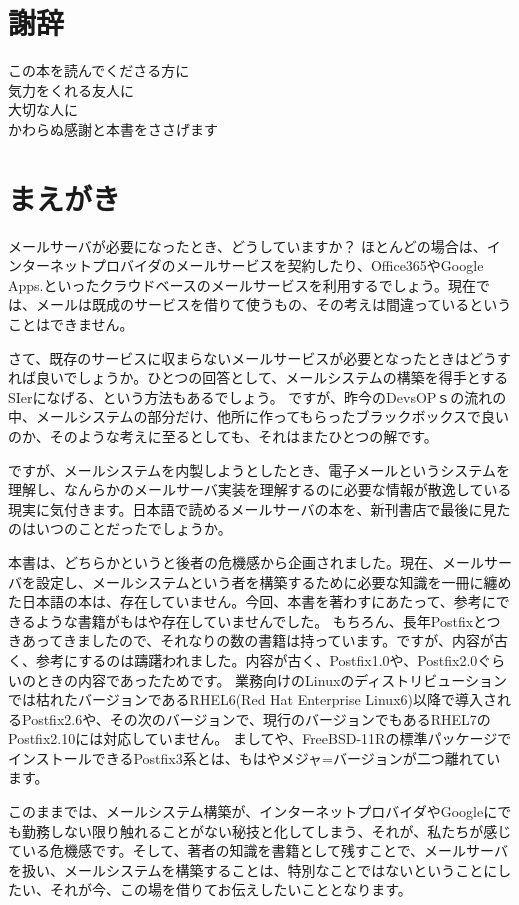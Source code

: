 \section*{謝辞}
\begin{center}
この本を読んでくださる方に \\
気力をくれる友人に \\
大切な人に \\
かわらぬ感謝と本書をささげます
\end{center}

\section*{まえがき}
メールサーバが必要になったとき、どうしていますか？
ほとんどの場合は、インターネットプロバイダのメールサービスを契約したり、Office365やGoogle Apps.といったクラウドベースのメールサービスを利用するでしょう。現在では、メールは既成のサービスを借りて使うもの、その考えは間違っているということはできません。

さて、既存のサービスに収まらないメールサービスが必要となったときはどうすれば良いでしょうか。ひとつの回答として、メールシステムの構築を得手とするSIerになげる、という方法もあるでしょう。
ですが、昨今のDevsOPｓの流れの中、メールシステムの部分だけ、他所に作ってもらったブラックボックスで良いのか、そのような考えに至るとしても、それはまたひとつの解です。

ですが、メールシステムを内製しようとしたとき、電子メールというシステムを理解し、なんらかのメールサーバ実装を理解するのに必要な情報が散逸している現実に気付きます。日本語で読めるメールサーバの本を、新刊書店で最後に見たのはいつのことだったでしょうか。

本書は、どちらかというと後者の危機感から企画されました。現在、メールサーバを設定し、メールシステムという者を構築するために必要な知識を一冊に纏めた日本語の本は、存在していません。今回、本書を著わすにあたって、参考にできるような書籍がもはや存在していませんでした。
もちろん、長年Postfixとつきあってきましたので、それなりの数の書籍は持っています。ですが、内容が古く、参考にするのは躊躇われました。内容が古く、Postfix1.0や、Postfix2.0ぐらいのときの内容であったためです。
業務向けのLinuxのディストリビューションでは枯れたバージョンであるRHEL6(Red Hat Enterprise Linux6)以降で導入されるPostfix2.6や、その次のバージョンで、現行のバージョンでもあるRHEL7のPostfix2.10には対応していません。
ましてや、FreeBSD-11Rの標準パッケージでインストールできるPostfix3系とは、もはやメジャ=バージョンが二つ離れています。

このままでは、メールシステム構築が、インターネットプロバイダやGoogleにでも勤務しない限り触れることがない秘技と化してしまう、それが、私たちが感じている危機感です。そして、著者の知識を書籍として残すことで、メールサーバを扱い、メールシステムを構築することは、特別なことではないということにしたい、それが今、この場を借りてお伝えしたいこととなります。


